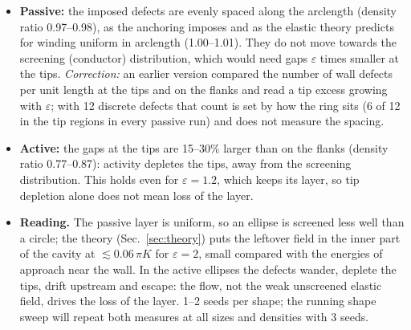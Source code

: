 \begin{itemize}
  \item \textbf{Passive:} the imposed defects are evenly spaced along the arclength (density ratio 0.97--0.98), as the anchoring imposes and
        as the elastic theory predicts for winding uniform in arclength (1.00--1.01). They do not move towards the screening (conductor)
        distribution, which would need gaps $\varepsilon$ times smaller at the tips.
        \emph{Correction:} an earlier version compared the number of wall defects per unit length at the tips and on the flanks and read
        a tip excess growing with $\varepsilon$; with 12 discrete defects that count is set by how the ring sits (6 of 12 in the tip regions
        in every passive run) and does not measure the spacing.
  \item \textbf{Active:} the gaps at the tips are 15--30\% larger than on the flanks (density ratio 0.77--0.87): activity depletes the tips,
        away from the screening distribution. This holds even for $\varepsilon=1.2$, which keeps its layer, so tip depletion alone does not mean
        loss of the layer.
  \item \textbf{Reading.} The passive layer is uniform, so an ellipse is screened less well than a circle; the theory (Sec.~\ref{sec:theory})
        puts the leftover field in the inner part of the cavity at $\lesssim0.06\,\pi K$ for $\varepsilon=2$, small compared with the energies of
        approach near the wall. In the active ellipses the defects wander, deplete the tips, drift upstream and escape: the flow, not the
        weak unscreened elastic field, drives the loss of the layer. 1--2 seeds per shape; the running shape sweep will repeat both measures
        at all sizes and densities with 3 seeds.
\end{itemize}
